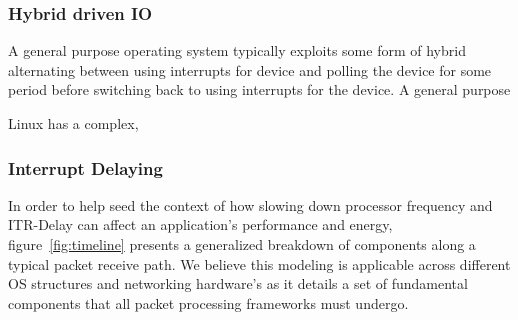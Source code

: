 \subsubsection{Hybrid driven IO}

A general purpose operating system typically exploits some form of hybrid alternating between using interrupts for device and polling the device for some period before switching back to using interrupts for the device.  A general purpose   

Linux has a complex, 

\subsubsection{Interrupt Delaying}

 

In order to help seed the context of how slowing down processor frequency and ITR-Delay can affect an application's performance and energy, figure~\ref{fig:timeline} presents a generalized breakdown of components along a typical packet receive path. We believe this modeling is applicable across different OS structures and networking hardware's as it details a set of fundamental components that all packet processing frameworks must undergo.

